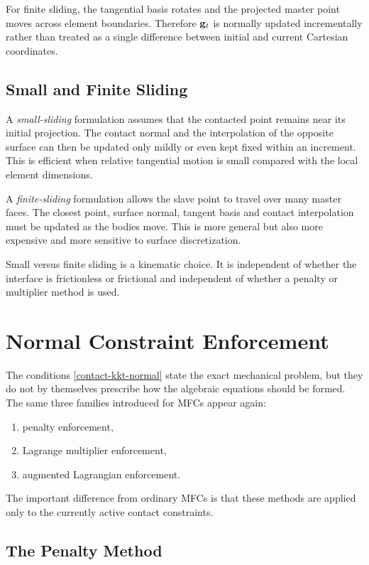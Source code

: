 For finite sliding, the tangential basis rotates and the projected master point
moves across element boundaries. Therefore $ \mathbf{g}_t $ is normally updated
incrementally rather than treated as a single difference between initial and
current Cartesian coordinates.

\subsection{Small and Finite Sliding}

A \textit{small-sliding} formulation assumes that the contacted point remains
near its initial projection. The contact normal and the interpolation of the
opposite surface can then be updated only mildly or even kept fixed within an
increment. This is efficient when relative tangential motion is small compared
with the local element dimensions.

A \textit{finite-sliding} formulation allows the slave point to travel over
many master faces. The closest point, surface normal, tangent basis and contact
interpolation must be updated as the bodies move. This is more general but also
more expensive and more sensitive to surface discretization.

Small versus finite sliding is a kinematic choice. It is independent of whether
the interface is frictionless or frictional and independent of whether a
penalty or multiplier method is used.

\section{Normal Constraint Enforcement}

The conditions \eqref{contact-kkt-normal} state the exact mechanical problem,
but they do not by themselves prescribe how the algebraic equations should be
formed. The same three families introduced for MFCs appear again:

\begin{enumerate}
    \item penalty enforcement,
    \item Lagrange multiplier enforcement,
    \item augmented Lagrangian enforcement.
\end{enumerate}

The important difference from ordinary MFCs is that these methods are applied
only to the currently active contact constraints.

\subsection{The Penalty Method}

